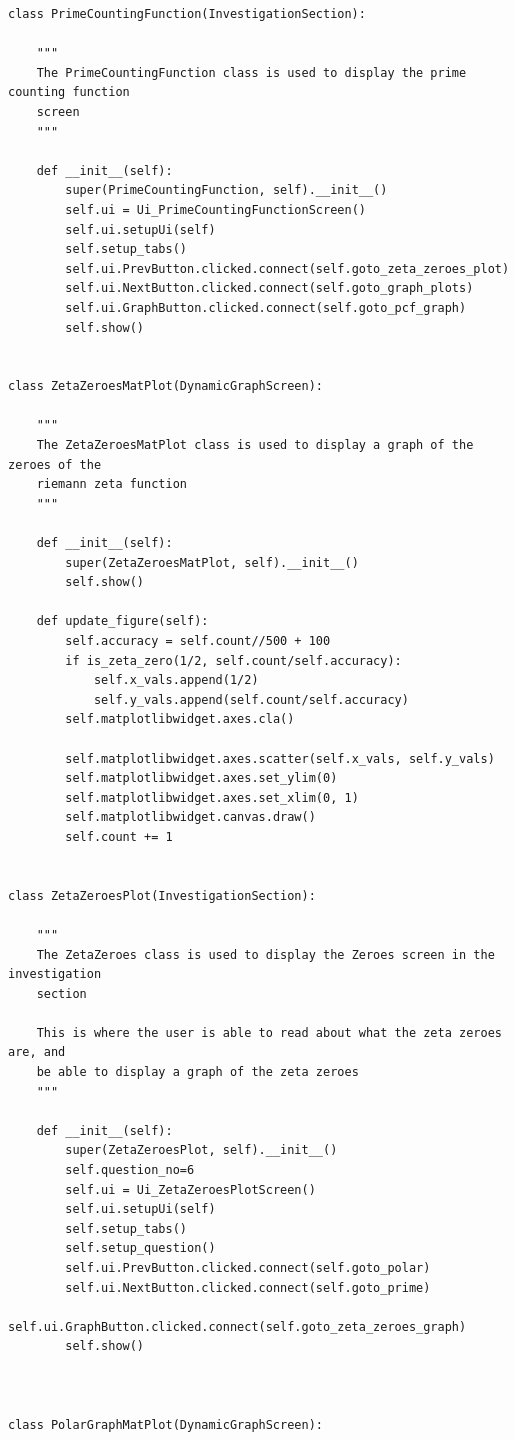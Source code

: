 \documentclass{article}
\begin{document}
\begin{lstlisting}
class PrimeCountingFunction(InvestigationSection):

    """
    The PrimeCountingFunction class is used to display the prime counting function
    screen
    """

    def __init__(self):
        super(PrimeCountingFunction, self).__init__()
        self.ui = Ui_PrimeCountingFunctionScreen()
        self.ui.setupUi(self)
        self.setup_tabs()
        self.ui.PrevButton.clicked.connect(self.goto_zeta_zeroes_plot)
        self.ui.NextButton.clicked.connect(self.goto_graph_plots)
        self.ui.GraphButton.clicked.connect(self.goto_pcf_graph)
        self.show()


class ZetaZeroesMatPlot(DynamicGraphScreen):

    """
    The ZetaZeroesMatPlot class is used to display a graph of the zeroes of the
    riemann zeta function
    """

    def __init__(self):
        super(ZetaZeroesMatPlot, self).__init__()
        self.show()

    def update_figure(self):
        self.accuracy = self.count//500 + 100
        if is_zeta_zero(1/2, self.count/self.accuracy):
            self.x_vals.append(1/2)
            self.y_vals.append(self.count/self.accuracy)
        self.matplotlibwidget.axes.cla()

        self.matplotlibwidget.axes.scatter(self.x_vals, self.y_vals)
        self.matplotlibwidget.axes.set_ylim(0)
        self.matplotlibwidget.axes.set_xlim(0, 1)
        self.matplotlibwidget.canvas.draw()
        self.count += 1


class ZetaZeroesPlot(InvestigationSection):

    """
    The ZetaZeroes class is used to display the Zeroes screen in the investigation
    section

    This is where the user is able to read about what the zeta zeroes are, and
    be able to display a graph of the zeta zeroes
    """

    def __init__(self):
        super(ZetaZeroesPlot, self).__init__()
        self.question_no=6
        self.ui = Ui_ZetaZeroesPlotScreen()
        self.ui.setupUi(self)
        self.setup_tabs()
        self.setup_question()
        self.ui.PrevButton.clicked.connect(self.goto_polar)
        self.ui.NextButton.clicked.connect(self.goto_prime)
        self.ui.GraphButton.clicked.connect(self.goto_zeta_zeroes_graph)
        self.show()



class PolarGraphMatPlot(DynamicGraphScreen):


\end{lstlisting}
\end{document}
